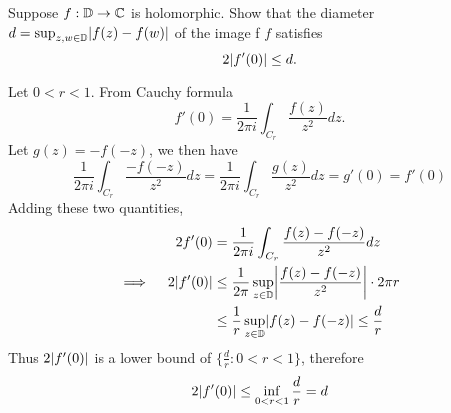 \begin{problem}[Stein, Ex 7, p. 65]
	Suppose $f:\mathbb D\to\C$ is holomorphic. Show that the diameter
  $d=\sup_{z,w\in\mathbb D}\abs{f(z)-f(w)}$ of the image f $f$
  satisfies
  \[2\lvert f'(0)\rvert\leq d.\]
\end{problem}
\begin{solution}
	Let $0<r<1$. From Cauchy formula
  \[f'(0)=\frac1{2\pi i}\int_{C_r}\frac{f(z)}{z^2}dz.\]
  Let $g(z)=-f(-z)$, we then have
  \[
    \frac1{2\pi i}\int_{C_r}\frac{-f(-z)}{z^2}dz
    =\frac1{2\pi i}\int_{C_r}\frac{g(z)}{z^2}dz
    =g'(0)=f'(0)
  \]
  Adding these two quantities,
  \begin{align*}
    2f'(0)
    &= \frac1{2\pi i}\int_{C_r}\frac{f(z)-f(-z)}{z^2}dz\\ \implies\quad
    2\abs{f'(0)}
    &\leq \frac1{2\pi}\sup_{z\in\mathbb D}\abs*{\frac{f(z)-f(-z)}{z^2}}\cdot 2\pi r\\
    &\leq \frac1r \sup_{z\in\mathbb D}\abs{f(z)-f(-z)}\leq \frac dr
  \end{align*}
  Thus $2\lvert f'(0)\rvert$ is a lower bound of $\{\frac dr:0<r<1\}$, therefore
  \[
    2\lvert f'(0)\rvert\leq\inf_{0<r<1}\frac dr = d
  \]
\end{solution}


